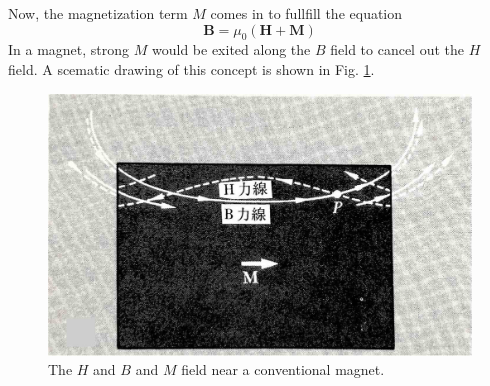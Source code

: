 Now, the magnetization term $M$ comes in to fullfill the equation
\begin{equation}
  \mathbf{B} = \mu_0\left( \mathbf{H} + \mathbf{M} \right)\nonumber
\end{equation}
In a magnet, strong $M$ would be exited along the $B$ field to cancel out the $H$ field.
A scematic drawing of this concept is shown in Fig. \ref{fig:BandHandM}.
\begin{figure}[H]
  \includegraphics[width=18cm, bb=9 9 900 550]{./section2Proposal/BandHandM.JPEG}
  \caption{The $H$ and $B$ and $M$ field near a conventional magnet.}
  \label{fig:BandHandM}
\end{figure}


\newpage
